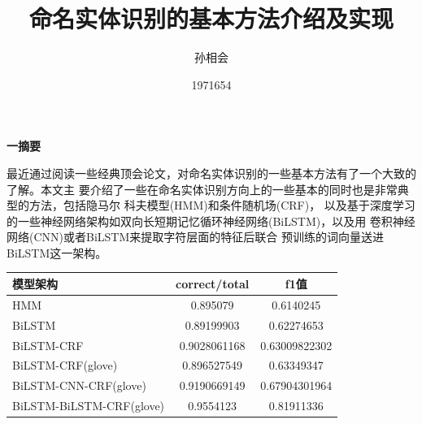 \documentclass[openany,oneside]{ctexbook}
\begin{document}
\makeatletter
\newcommand\Csub{\@startsection{subsection}{2}%
 {0pt}{-\baselineskip}{.2\baselineskip}%
 {\centering\itshape}}
\newcommand\Lsub{\@startsection{subsection}{2}%
 {0pt}{-\baselineskip}{.2\baselineskip}%
 {\raggedright\sffamily}}
\newcommand\Rsub{\@startsection{subsection}{2}%
 {0pt}{-\baselineskip}{.2\baselineskip}%
 {\raggedleft\MakeUppercase}}
\newcommand\Hsub{\@startsection{subsection}{2}%
 {0pt}{-\baselineskip}{.2\baselineskip}%
 {\hrule\medskip\itshape}}
\makeatother

\pagestyle{empty} %

\mainmatter
\frontmatter
\renewcommand{\thepage}{\arabic{page}} %

\pagestyle{plain}
\title{命名实体识别的基本方法介绍及实现}
\author{孙相会}
\date{1971654}
\maketitle

\setcounter{page}{1}
\newpage

\begin{center}
   
    {\textbf{\sihao\hei \quad 一\quad 摘要}}
\end{center}

最近通过阅读一些经典顶会论文，对命名实体识别的一些基本方法有了一个大致的了解。本文主
要介绍了一些在命名实体识别方向上的一些基本的同时也是非常典型的方法，包括隐马尔
科夫模型(HMM)和条件随机场(CRF)，
以及基于深度学习的一些神经网络架构如双向长短期记忆循环神经网络(BiLSTM)，以及用
卷积神经网络(CNN)或者BiLSTM来提取字符层面的特征后联合
预训练的词向量送进BiLSTM这一架构。

\begin{table}[htp]
   \centering
   \begin{tabular}{|l|c|c|}
      \hline
      模型架构&correct/total&f1值 \\ \hline
      HMM&0.895079&0.6140245 \\ \hline
      BiLSTM&0.89199903&0.62274653 \\ \hline
      BiLSTM-CRF&0.9028061168&0.63009822302 \\ \hline
      BiLSTM-CRF(glove)&0.896527549&0.63349347 \\ \hline
      BiLSTM-CNN-CRF(glove)&0.9190669149&0.67904301964 \\ \hline
      BiLSTM-BiLSTM-CRF(glove)&0.9554123&0.81911336 \\ \hline 

      
   \end{tabular}
   
\end{table}
\end{document}
